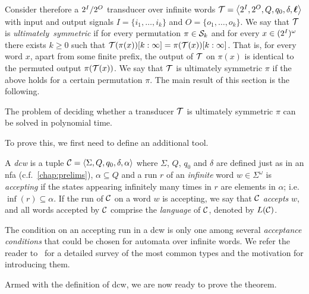 Consider therefore a $2^{I}/2^{O}$ transducer over infinite words $\mathcal{T}=\left< 2^{I},2^{O},Q,q_0,\delta,\boldsymbol{\ell}\right>$ with input and output signals $I=\{i_1,\ldots,i_k\}$ and $O=\{o_1,\ldots,o_k\}$. We say that $\mathcal{T}$ is \emph{ultimately~symmetric} if for every permutation $\pi\in \mathcal{S}_k$ and for every $x\in (2^{I})^\omega$ there exists $k\ge 0$ such that $\mathcal{T}(\pi(x))[k:\infty] = \pi(\mathcal{T}(x))[k:\infty]$. That is, for every word $x$, apart from some finite prefix, the output of $\mathcal{T}$ on $\pi(x)$ is identical to the permuted output $\pi(\mathcal{T}(x))$. We say that $\mathcal{T}$ is ultimately symmetric \WRT $\pi$ if the above holds for a certain permutation $\pi$. The main result of this section is the following.

\begin{theorem}
    \label{thm:ultimate}
	The problem of deciding whether a transducer $\mathcal{T}$ is ultimately symmetric \WRT $\pi$ can be solved in polynomial time.
\end{theorem}
To prove this, we first need to define an additional tool.

A \emph{\gls{dcw}} is a tuple $\mathcal{C}=\left< \Sigma,Q,q_0,\delta,\alpha\right>$
where $\Sigma$, $Q$, $q_0$ and $\delta$ are defined just as in an \gls{nfa} (c.f.~\cref{chap:prelims}), $\alpha \subseteq Q$ and a run $r$ of an \emph{infinite} word $w\in\Sigma^\omega$ is \emph{accepting} if the states appearing infinitely many times in $r$ are elements in $\alpha$; i.e. $\inf(r) \subseteq \alpha$. If the run of $\mathcal{C}$ on a word $w$ is accepting, we say that $\mathcal{C}$ \emph{accepts} $w$, and all words accepted by $\mathcal{C}$ comprise the \emph{language} of $\mathcal{C}$, denoted by $L(\mathcal{C})$.

The condition on an accepting run in a \gls{dcw} is only one among several \emph{acceptance conditions} that could be chosen for automata over infinite words. We refer the reader to~\cite{Boker2018} for a detailed survey of the most common types and the motivation for introducing them.

Armed with the definition of \gls{dcw}, we are now ready to prove the theorem.

